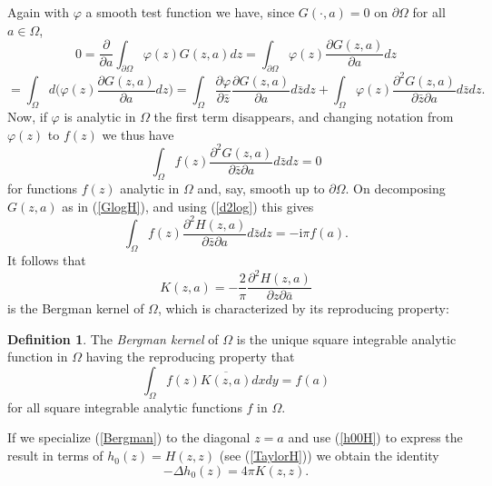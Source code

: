\documentclass[reqno,12pt]{article}
\theoremstyle{plain}
\theoremstyle{definition}
\newtheorem{definition}{Definition}[section]
\numberwithin{equation}{section}
\numberwithin{figure}{section}
\def\I{\mathrm{i}}
\begin{document}
Again with $\varphi$ a smooth test function we have, since $G(\cdot,a)=0$ on $\partial\Omega$ for all $a\in\Omega$,
$$
0=\frac{\partial}{\partial a}\int_{\partial \Omega}\varphi (z)G(z,a)dz=
\int_{\partial \Omega}\varphi (z)\frac{\partial G(z,a)}{\partial a}dz
$$
$$
=\int_{\Omega}d\Big(\varphi (z)\frac{\partial G(z,a)}{\partial a}dz\Big)
=\int_{ \Omega}\frac{\partial \varphi}{\partial \bar{z}}\frac{\partial G(z,a)}{\partial a}d\bar{z}dz
+\int_\Omega \varphi(z){\frac{\partial^2 G(z,a)}{\partial \bar{z}\partial {a}}} d\bar{z}dz.
$$
Now, if $\varphi$ is analytic in $\Omega$ the first term disappears, and changing notation from
$\varphi(z)$ to $f(z)$ we thus have
\begin{equation}\label{intfG}
\int_\Omega f(z){\frac{\partial^2 G(z,a)}{\partial \bar{z}\partial {a}}} d\bar{z}dz=0
\end{equation}
for functions $f(z)$ analytic in $\Omega$ and, say, smooth up to $\partial\Omega$.
On decomposing $G(z,a)$ as in (\ref{GlogH}), and using (\ref{d2log}) this gives 
$$
\int_\Omega f(z){\frac{\partial^2 H(z,a)}{\partial \bar{z}\partial {a}}} d\bar{z}dz=-\I{\pi}f(a).
$$
It follows that
\begin{equation}\label{Bergman}
K(z,a)=-\frac{2}{\pi}{\frac{\partial^2 H(z,a)}{\partial {z}\partial \bar{a}}}
\end{equation}
is the Bergman kernel of $\Omega$, which is characterized by its reproducing property:
\begin{definition}\label{def:Bergman}
The {\it Bergman kernel} of $\Omega$ is the unique square integrable analytic function in $\Omega$ 
having the reproducing property that
\begin{equation}\label{Kreproducing0}
\int_\Omega f(z)\overline{K(z,a)}dxdy=f(a)
\end{equation}
for all square integrable analytic functions $f$ in $\Omega$.
\end{definition}

If we specialize (\ref{Bergman}) to the diagonal $z=a$ 
and use (\ref{h00H}) to express the result in terms of $h_0(z)=H(z,z)$ (see (\ref{TaylorH})) we obtain
the identity
\begin{equation}\label{Deltah0K}
-\Delta h_0(z)=4\pi K(z,z). 
\end{equation}
\end{document}
